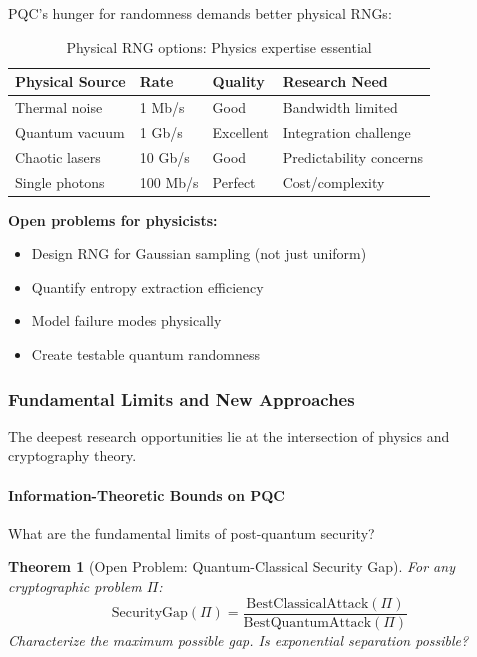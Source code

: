\documentclass[11pt,a4paper]{article}
\newtheorem{theorem}{Theorem}
\begin{document}
PQC's hunger for randomness demands better physical RNGs:

\begin{table}[h]
\centering
\begin{tabular}{|l|l|l|l|}
\hline
\textbf{Physical Source} & \textbf{Rate} & \textbf{Quality} & \textbf{Research Need} \\
\hline
Thermal noise & 1 Mb/s & Good & Bandwidth limited \\
Quantum vacuum & 1 Gb/s & Excellent & Integration challenge \\
Chaotic lasers & 10 Gb/s & Good & Predictability concerns \\
Single photons & 100 Mb/s & Perfect & Cost/complexity \\
\hline
\end{tabular}
\caption{Physical RNG options: Physics expertise essential}
\end{table}

\textbf{Open problems for physicists:}
\begin{itemize}
    \item Design RNG for Gaussian sampling (not just uniform)
    \item Quantify entropy extraction efficiency
    \item Model failure modes physically
    \item Create testable quantum randomness
\end{itemize}

\subsubsection{Fundamental Limits and New Approaches}

The deepest research opportunities lie at the intersection of physics and cryptography theory.

\paragraph{Information-Theoretic Bounds on PQC}

What are the fundamental limits of post-quantum security?

\begin{theorem}[Open Problem: Quantum-Classical Security Gap]
For any cryptographic problem $\Pi$:
$$\text{SecurityGap}(\Pi) = \frac{\text{BestClassicalAttack}(\Pi)}{\text{BestQuantumAttack}(\Pi)}$$
Characterize the maximum possible gap. Is exponential separation possible?
\end{theorem}
\end{document}
